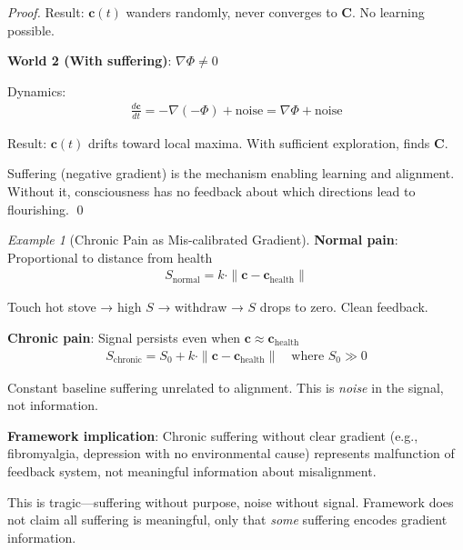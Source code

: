\documentclass[11pt,a4paper]{article}
\theoremstyle{definition}
\theoremstyle{remark}
\newtheorem{example}{Example}[section]
\newcommand{\cc}{\mathbf{c}}
\begin{document}
\begin{small}
\begin{enumerate}
\begin{proof}
Result: \(\cc(t)\) wanders randomly, never converges to \(\mathbf{C}\). No learning possible.

\textbf{World 2 (With suffering)}: \(\nabla \Phi \neq 0\)

Dynamics:
\begin{align}
\frac{d\cc}{dt} = -\nabla(-\Phi) + \text{noise} = \nabla \Phi + \text{noise}
\end{align}

Result: \(\cc(t)\) drifts toward local maxima. With sufficient exploration, finds \(\mathbf{C}\).

Suffering (negative gradient) is the mechanism enabling learning and alignment. Without it, consciousness has no feedback about which directions lead to flourishing. \qed
\end{proof}

\begin{example}[Chronic Pain as Mis-calibrated Gradient]
\textbf{Normal pain}: Proportional to distance from health
\begin{align}
S_{\text{normal}} = k \cdot \|\cc - \cc_{\text{health}}\|
\end{align}

Touch hot stove → high \(S\) → withdraw → \(S\) drops to zero. Clean feedback.

\textbf{Chronic pain}: Signal persists even when \(\cc \approx \cc_{\text{health}}\)
\begin{align}
S_{\text{chronic}} = S_0 + k \cdot \|\cc - \cc_{\text{health}}\| \quad \text{where } S_0 \gg 0
\end{align}

Constant baseline suffering unrelated to alignment. This is \textit{noise} in the signal, not information.

\textbf{Framework implication}: Chronic suffering without clear gradient (e.g., fibromyalgia, depression with no environmental cause) represents malfunction of feedback system, not meaningful information about misalignment.

This is tragic—suffering without purpose, noise without signal. Framework does not claim all suffering is meaningful, only that \textit{some} suffering encodes gradient information.
\end{example}

\begin{figure}[H]
\centering
{}
\end{figure}
\end{enumerate}
\end{small}
\end{document}
